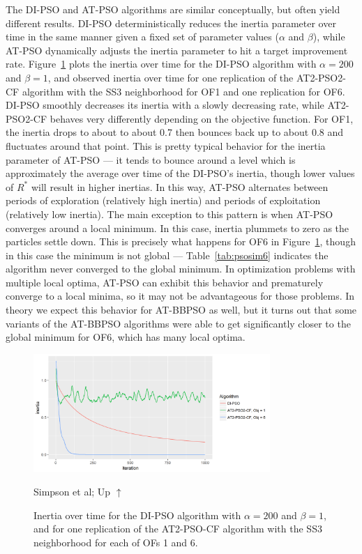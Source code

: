 \documentclass[cmbright]{staauth}
\begin{document}
The DI-PSO and AT-PSO algorithms are similar conceptually, but often yield different results. DI-PSO deterministically reduces the inertia parameter over time in the same manner given a fixed set of parameter values ($\alpha$ and $\beta$), while AT-PSO dynamically adjusts the inertia parameter to hit a target improvement rate. Figure~\ref{fig:inertia} plots the inertia over time for the DI-PSO algorithm with $\alpha=200$ and $\beta=1$, and observed inertia over time for one replication of the AT2-PSO2-CF algorithm with the SS3 neighborhood for OF1 and one replication for OF6. DI-PSO smoothly decreases its inertia with a slowly decreasing rate, while AT2-PSO2-CF behaves very differently depending on the objective function. For OF1, the inertia drops to about to about 0.7 then bounces back up to about 0.8 and fluctuates around that point. This is pretty typical behavior for the inertia parameter of AT-PSO --- it tends to bounce around a level which is approximately the average over time of the DI-PSO's inertia, though lower values of $R^*$ will result in higher inertias. In this way, AT-PSO alternates between periods of exploration (relatively high inertia) and periods of exploitation (relatively low inertia). The main exception to this pattern is when AT-PSO converges around a local minimum. In this case, inertia plummets to zero as the particles settle down. This is precisely what happens for OF6 in Figure~\ref{fig:inertia}, though in this case the minimum is not global --- Table~\ref{tab:psosim6} indicates the algorithm never converged to the global minimum. In optimization problems with multiple local optima, AT-PSO can exhibit this behavior and prematurely converge to a local minima, so it may not be advantageous for those problems. In theory we expect this behavior for AT-BBPSO as well, but it turns out that some variants of the AT-BBPSO algorithms were able to get significantly closer to the global minimum for OF6, which has many local optima.

\begin{figure}[p]
\begin{preview}
\centering
\includegraphics[width=0.8\textwidth]{inertiaplot.png}
\ifPreview
\caption{Simpson et al; Up $\uparrow$}
\else
\caption{Inertia over time for the DI-PSO algorithm with $\alpha=200$ and $\beta=1$, and for one replication of the AT2-PSO-CF algorithm with the SS3 neighborhood for each of OFs 1 and 6.}
\label{fig:inertia}
\fi
\end{preview}
\end{figure}
\end{document}
